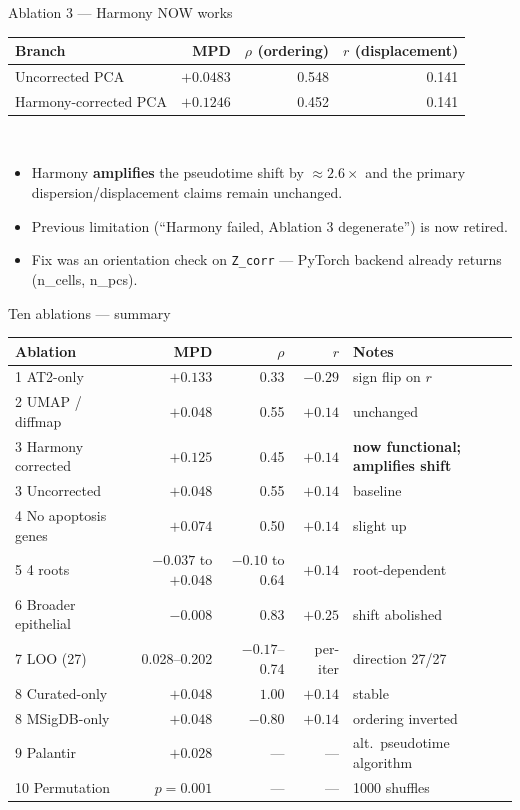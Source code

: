 \documentclass[aspectratio=169]{beamer}
\begin{document}
\begin{frame}{Ablation 3 --- Harmony NOW works}
\small
\begin{tabular}{lrrr}
\toprule
Branch & MPD & $\rho$ (ordering) & $r$ (displacement) \\
\midrule
Uncorrected PCA & $+0.0483$ & 0.548 & 0.141 \\
Harmony-corrected PCA & $+0.1246$ & 0.452 & 0.141 \\
\bottomrule
\end{tabular}
\\[4pt]
\begin{itemize}
  \item Harmony \textbf{amplifies} the pseudotime shift by $\approx 2.6\times$ and the
        primary dispersion/displacement claims remain unchanged.
  \item Previous limitation (``Harmony failed, Ablation 3 degenerate'') is now retired.
  \item Fix was an orientation check on \texttt{Z\_corr} --- PyTorch backend already returns
        (n\_cells, n\_pcs).
\end{itemize}
\end{frame}

\begin{frame}{Ten ablations --- summary}
\scriptsize
\begin{tabular}{lrrr l}
\toprule
Ablation & MPD & $\rho$ & $r$ & Notes \\
\midrule
1 AT2-only & $+0.133$ & 0.33 & $-0.29$ & sign flip on $r$ \\
2 UMAP / diffmap & $+0.048$ & 0.55 & $+0.14$ & unchanged \\
3 Harmony corrected & $+0.125$ & 0.45 & $+0.14$ & \textbf{now functional; amplifies shift} \\
3 Uncorrected & $+0.048$ & 0.55 & $+0.14$ & baseline \\
4 No apoptosis genes & $+0.074$ & 0.50 & $+0.14$ & slight up \\
5 4 roots & $-0.037$ to $+0.048$ & $-0.10$ to 0.64 & $+0.14$ & root-dependent \\
6 Broader epithelial & $-0.008$ & 0.83 & $+0.25$ & \alert{shift abolished} \\
7 LOO (27) & 0.028--0.202 & $-0.17$--0.74 & per-iter & direction 27/27 \\
8 Curated-only & $+0.048$ & $1.00$ & $+0.14$ & stable \\
8 MSigDB-only & $+0.048$ & $-0.80$ & $+0.14$ & \alert{ordering inverted} \\
9 Palantir & $+0.028$ & --- & --- & alt.\ pseudotime algorithm \\
10 Permutation & $p=0.001$ & --- & --- & 1000 shuffles \\
\bottomrule
\end{tabular}
\end{frame}
\end{document}
